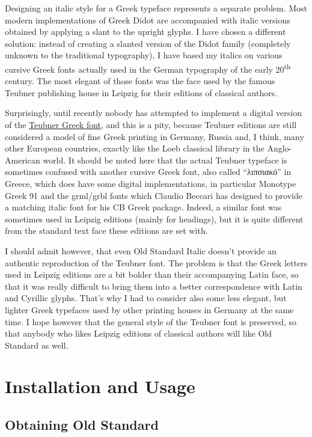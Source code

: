 \documentclass[12pt,a4paper,openany]{book}
\begin{document}
Designing an italic style for a Greek typeface represents a separate
problem. Most modern implementations of Greek Didot are accompanied with
italic versions obtained by applying a slant to the upright glyphs. I have
chosen a different solution: instead of creating a slanted version of
the Didot family (completely unknown to the traditional typography), I have
based my italics on various cursive Greek fonts actually used in the German
typography of the early 20\textsuperscript{th} century. The most elegant of
those fonts was the face used by the famous Teubner publishing house in
Leipzig for their editions of classical authors.

Surprisingly, until recently nobody has attempted to implement a digital version
of the \hyperlink{fig:teubner}{Teubner Greek font}, and this is a pity,
because Teubner editions are still considered a model of fine Greek
printing in Germany, Russia and, I think, many other European countries,
exactly like the Loeb classical library in the Anglo-American world. It
should be noted here that the actual Teubner typeface is sometimes
confused with another cursive Greek font, also called “λιπσιακό” in Greece,
which does have some digital implementations, in particular Monotype Greek
91 and the grml/grbl fonts which Claudio Beccari has designed to provide a
matching italic font for his CB Greek package. Indeed, a similar font was
sometimes used in Leipzig editions (mainly for headings), but it is quite
different from the standard text face these editions are set with.

I should admit however, that even Old Standard Italic doesn’t provide an
authentic reproduction of the Teubner font. The problem is that the Greek
letters used in Leipzig editions are a bit bolder than their accompanying
Latin face, so that it was really difficult to bring them into a better
correspondence with Latin and Cyrillic glyphs. That’s why I had to consider
also some less elegant, but lighter Greek typefaces used by other printing
houses in Germany at the same time. I hope however that the general style
of the Teubner font is preserved, so that anybody who likes Leipzig
editions of classical authors will like Old Standard as well.

\chapter{Installation and Usage}
\thispagestyle{empty}

\section{Obtaining Old Standard}
\end{document}
